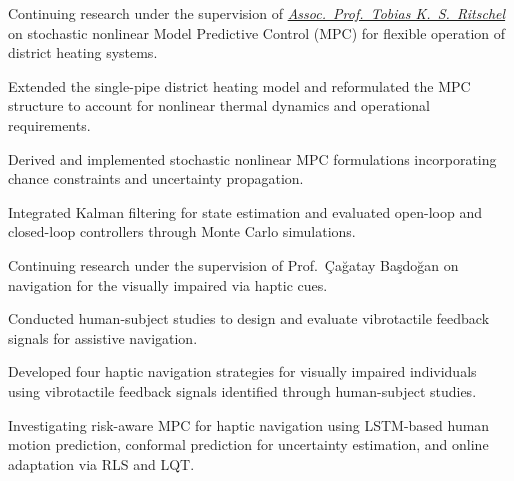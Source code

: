 

  \begin{Highlights}
    \item Continuing research under the supervision of \href{https://people.compute.dtu.dk/tobk/index.html}{\emph{Assoc.~Prof.~Tobias K.~S.~Ritschel}} on stochastic nonlinear Model Predictive Control (MPC) for flexible operation of district heating systems.
    \item Extended the single-pipe district heating model and reformulated the MPC structure to account for nonlinear thermal dynamics and operational requirements.
  \end{Highlights}
  \begin{Highlights}
    \item Derived and implemented stochastic nonlinear MPC formulations incorporating chance constraints and uncertainty propagation.
    \item Integrated Kalman filtering for state estimation and evaluated open-loop and closed-loop controllers through Monte Carlo simulations.
  \end{Highlights}

  \begin{Highlights}
    \item Continuing research under the supervision of Prof.~Çağatay Başdoğan on navigation for the visually impaired via haptic cues.
    \item Conducted human-subject studies to design and evaluate vibrotactile feedback signals for assistive navigation.
    \item Developed four haptic navigation strategies for visually impaired individuals using vibrotactile feedback signals identified through human-subject studies.
    \item Investigating risk-aware MPC for haptic navigation using LSTM-based human motion prediction, conformal prediction for uncertainty estimation, and online adaptation via RLS and LQT.
  \end{Highlights}

